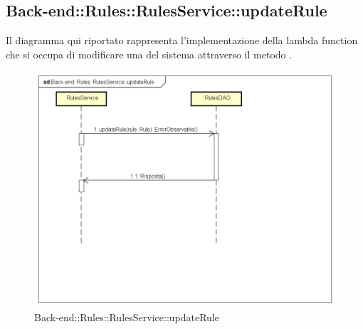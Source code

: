 \subsection{Back-end::Rules::RulesService::updateRule}
Il diagramma qui riportato rappresenta l'implementazione della lambda function che si occupa di modificare una  del sistema attraverso il metodo .
\begin{figure}[h] \centering \includegraphics[width=\textwidth,height=\textheight,keepaspectratio]{images/diagrams/back-end/Ufficial_Backend/Back-endRulesRulesServiceupdateRule.png} 	\caption{Back-end::Rules::RulesService::updateRule}
\end{figure} 
\newpage


